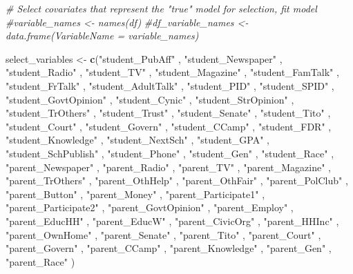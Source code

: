 \documentclass[
]{article}
\newenvironment{Shaded}{\begin{snugshade}}{\end{snugshade}}
\newcommand{\CommentTok}[1]{\textcolor[rgb]{0.56,0.35,0.01}{\textit{#1}}}
\newcommand{\FunctionTok}[1]{\textcolor[rgb]{0.13,0.29,0.53}{\textbf{#1}}}
\newcommand{\NormalTok}[1]{#1}
\newcommand{\OtherTok}[1]{\textcolor[rgb]{0.56,0.35,0.01}{#1}}
\newcommand{\StringTok}[1]{\textcolor[rgb]{0.31,0.60,0.02}{#1}}
\begin{document}
\begin{Shaded}
\begin{Highlighting}[]
\CommentTok{\# Select covariates that represent the "true" model for selection, fit model}
\CommentTok{\#variable\_names \textless{}{-} names(df)}
\CommentTok{\#df\_variable\_names \textless{}{-} data.frame(VariableName = variable\_names)}

\NormalTok{select\_variables }\OtherTok{\textless{}{-}} \FunctionTok{c}\NormalTok{(}\StringTok{"student\_PubAff"}\NormalTok{ , }
\StringTok{"student\_Newspaper"}\NormalTok{ , }
\StringTok{"student\_Radio"}\NormalTok{ , }
\StringTok{"student\_TV"}\NormalTok{ , }
\StringTok{"student\_Magazine"}\NormalTok{ , }
\StringTok{"student\_FamTalk"}\NormalTok{ , }
\StringTok{"student\_FrTalk"}\NormalTok{ , }
\StringTok{"student\_AdultTalk"}\NormalTok{ , }
\StringTok{"student\_PID"}\NormalTok{ , }
\StringTok{"student\_SPID"}\NormalTok{ , }
\StringTok{"student\_GovtOpinion"}\NormalTok{ , }
\StringTok{"student\_Cynic"}\NormalTok{ , }
\StringTok{"student\_StrOpinion"}\NormalTok{ , }
\StringTok{"student\_TrOthers"}\NormalTok{ , }
\StringTok{"student\_Trust"}\NormalTok{ , }
\StringTok{"student\_Senate"}\NormalTok{ , }
\StringTok{"student\_Tito"}\NormalTok{ , }
\StringTok{"student\_Court"}\NormalTok{ , }
\StringTok{"student\_Govern"}\NormalTok{ , }
\StringTok{"student\_CCamp"}\NormalTok{ , }
\StringTok{"student\_FDR"}\NormalTok{ , }
\StringTok{"student\_Knowledge"}\NormalTok{ , }
\StringTok{"student\_NextSch"}\NormalTok{ , }
\StringTok{"student\_GPA"}\NormalTok{ , }
\StringTok{"student\_SchPublish"}\NormalTok{ , }
\StringTok{"student\_Phone"}\NormalTok{ , }
\StringTok{"student\_Gen"}\NormalTok{ , }
\StringTok{"student\_Race"}\NormalTok{ , }
\StringTok{"parent\_Newspaper"}\NormalTok{ , }
\StringTok{"parent\_Radio"}\NormalTok{ , }
\StringTok{"parent\_TV"}\NormalTok{ , }
\StringTok{"parent\_Magazine"}\NormalTok{ , }
\StringTok{"parent\_TrOthers"}\NormalTok{ , }
\StringTok{"parent\_OthHelp"}\NormalTok{ , }
\StringTok{"parent\_OthFair"}\NormalTok{ , }
\StringTok{"parent\_PolClub"}\NormalTok{ , }
\StringTok{"parent\_Button"}\NormalTok{ , }
\StringTok{"parent\_Money"}\NormalTok{ , }
\StringTok{"parent\_Participate1"}\NormalTok{ , }
\StringTok{"parent\_Participate2"}\NormalTok{ , }
\StringTok{"parent\_GovtOpinion"}\NormalTok{ , }
\StringTok{"parent\_Employ"}\NormalTok{ , }
\StringTok{"parent\_EducHH"}\NormalTok{ , }
\StringTok{"parent\_EducW"}\NormalTok{ , }
\StringTok{"parent\_CivicOrg"}\NormalTok{ , }
\StringTok{"parent\_HHInc"}\NormalTok{ , }
\StringTok{"parent\_OwnHome"}\NormalTok{ , }
\StringTok{"parent\_Senate"}\NormalTok{ , }
\StringTok{"parent\_Tito"}\NormalTok{ , }
\StringTok{"parent\_Court"}\NormalTok{ , }
\StringTok{"parent\_Govern"}\NormalTok{ , }
\StringTok{"parent\_CCamp"}\NormalTok{ , }
\StringTok{"parent\_Knowledge"}\NormalTok{ , }
\StringTok{"parent\_Gen"}\NormalTok{ , }
\StringTok{"parent\_Race"}\NormalTok{  )}


\end{Highlighting}
\end{Shaded}
\end{document}
